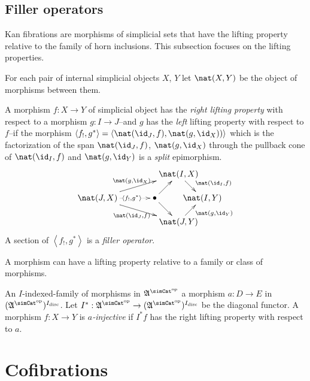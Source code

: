 \documentclass{tac}
\newcommand\hide[1]{}
\newcommand\ri{^*}
\newcommand\dual{^{\mathrm{op}}}
\newcommand\disc{_{\mathrm{disc}}}
\newcommand\s{^{\simCat\dual}}
\newcommand\bang{!}
\newcommand\of{:}
\newcommand\tuplet[1]{\left\langle #1 \right\rangle}
\newcommand\ambient{\mathfrak A}
\begin{document}
\subsection{Filler operators} %
Kan fibrations are morphisms of simplicial sets that have the lifting property relative to the family of horn inclusions. This subsection focuses on the lifting properties.

\begin{definition} For each pair of internal simplicial objects $X$, $Y$ let $\nat(X,Y)$ be the object of morphisms between them.

A morphism $f\of X\to Y$ of simplicial object has the \emph{right lifting property} with respect to a morphism $g\of I\to J$--and $g$ has the \emph{left} lifting property with respect to $f$--if the morphism $\tuplet{f_!,g\ri} = \tuplet{\nat(\id_J,f),\nat(g,\id_X))}$ 
which is the factorization of the span $\nat(\id_J,f)$, $\nat(g,\id_X)$ through the pullback cone of $\nat(\id_I,f)$ and $\nat(g,\id_Y)$
is a \emph{split} epimorphism.
\[\xy
(34,20)*+{\nat(I,X)}="top",(0,10)*+{\nat(J,X)}="left",(24,10)*+{\bullet}="middle",(44,10)*+{\nat(I,Y)}="right",(34,0)*+{\nat(J,Y)}="bottom"
\ar^{\nat(g,\id_X)} "left";"top" \ar@{.>}|(.6){\tuplet{f_!,g\ri}} "left";"middle" \ar_{\nat(\id_J,f)} "left";"bottom" \ar "middle";"bottom"
\ar "middle";"top" \ar^(.6){\nat(\id_I,f)} "top";"right" \ar_(.6){\nat(g,\id_Y)} "bottom";"right"
\endxy\]
A section of $\tuplet{f_\bang,g\ri}$ is a \emph{filler operator}.\label{lifting}
\end{definition}

A morphism can have a lifting property relative to a family or class of morphisms.

\hide{
Explain $I\ri\of\ambient\s\to (\ambient\s)^{I\disc}$ somewhere. It should be an internal simplicial object of the slice category. i.e. $(\ambient/I)\s$. 
}
\begin{definition}[Injective] An $I$-indexed-family of morphisms in $\ambient\s$ a morphism $a\of D\to E$ in $(\ambient\s)^{I\disc}$. Let $I\ri\of\ambient\s\to (\ambient\s)^{I\disc}$ be the diagonal functor. A morphism $f\of X\to Y$ is \emph{$a$-injective} if $I\ri f$ has the right lifting property with respect to $a$.
\end{definition}


\section{Cofibrations}%
\end{document}
